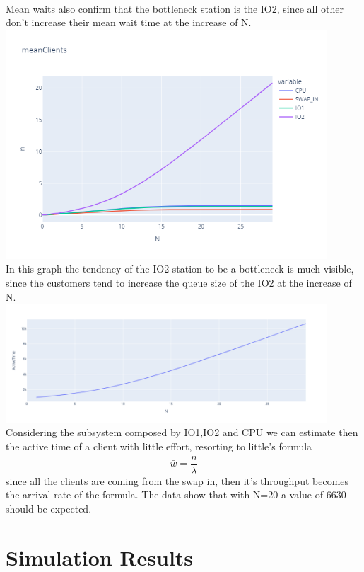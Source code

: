 \documentclass[12pt,a4paper]{article}
\begin{document}
    \\
    Mean waits also confirm that the bottleneck station is the IO2, since all other don't increase their mean wait time at the increase of N.
    \\
    \includegraphics[width=0.9\textwidth]{Images/meanClients.png}
    \\
    In this graph the tendency of the IO2 station to be a bottleneck is much visible, since the customers tend to increase the queue size of the IO2 at the increase of N.
    \\
    \includegraphics[width=0.9\textwidth]{Images/ActiveTimes.png}
    \\
    Considering the subsystem composed by IO1,IO2 and CPU we can estimate then the active time of a client with little effort, resorting to little's formula 
    $$
    \bar{w}= \frac{\bar{n}}{\lambda}
    $$
    since all the clients are coming from the swap in, then it's throughput becomes the arrival rate of the formula. The data show that with N=20 a value of 6630 should be expected.
    \section{Simulation Results}
\end{document}
